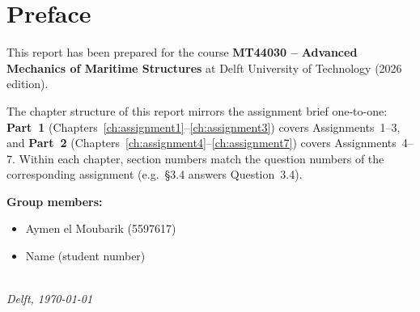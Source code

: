 \chapter{Preface}

This report has been prepared for the course \textbf{MT44030 -- Advanced Mechanics of Maritime Structures} at Delft University of Technology (2026 edition).

The chapter structure of this report mirrors the assignment brief one-to-one: \textbf{Part~1} (Chapters~\ref{ch:assignment1}--\ref{ch:assignment3}) covers Assignments~1--3, and \textbf{Part~2} (Chapters~\ref{ch:assignment4}--\ref{ch:assignment7}) covers Assignments~4--7. Within each chapter, section numbers match the question numbers of the corresponding assignment (e.g.\ \S3.4 answers Question~3.4).

\bigskip
\noindent\textbf{Group members:}
\begin{itemize}
  \item Aymen el Moubarik (5597617)
  \item Name (student number)
\end{itemize}

\begin{flushright}
{\makeatletter\itshape
  \@author\\
  Delft, \today
\makeatother}%
\end{flushright}
